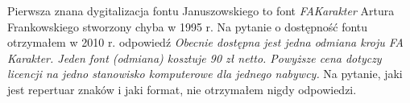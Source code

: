 Pierwsza znana dygitalizacja fontu Januszowskiego to font
\textit{FAKarakter} Artura Frankowskiego stworzony chyba w 1995 r. Na
pytanie o dostępność fontu otrzymałem w 2010 r. odpowiedź
\textit{Obecnie dostępna jest jedna odmiana kroju FA Karakter.  Jeden
  font (odmiana) kosztuje 90 zł netto. Powyższe cena dotyczy licencji
  na jedno stanowisko komputerowe dla jednego nabywcy.} Na pytanie,
jaki jest repertuar znaków i jaki format, nie otrzymałem nigdy
odpowiedzi.


